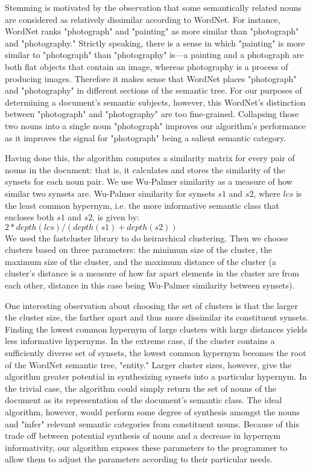 \documentclass[12pt]{article}
\begin{document}
    Stemming is motivated by the observation that some semantically related nouns are considered as relatively dissimilar according to WordNet. For instance, WordNet ranks "photograph" and "painting" as more similar than "photograph" and "photography." Strictly speaking, there is a sense in which "painting" is more similar to "photograph" than "photography" is—a painting and a photograph are both flat objects that contain an image, whereas photography is a process of producing images. Therefore it makes sense that WordNet places "photograph" and "photography" in different sections of the semantic tree. For our purposes of determining a document's semantic subjects, however, this WordNet's distinction between "photograph" and "photography" are too fine-grained. Collapsing those two nouns into a single noun "photograph" improves our algorithm's performance as it improves the signal for "photograph" being a salient semantic category.

    Having done this, the algorithm computes a similarity matrix for every pair of nouns in the document: that is, it calculates and stores the similarity of the synsets for each noun pair. We use Wu-Palmer similarity as a measure of how similar two synsets are. Wu-Palmer similarity for synsets $s1$ and $s2$, where $lcs$ is the least common hypernym, i.e. the more informative semantic class that encloses both $s1$ and $s2$, is given by:\\

    $2*depth(lcs) / (depth(s1) + depth(s2))$\\

    We used the fastcluster library to do heirarchical clustering. Then we choose clusters based on three parameters: the minimum size of the cluster, the maximum size of the cluster, and the maximum distance of the cluster (a cluster's distance is a measure of how far apart elements in the cluster are from each other, distance in this case being Wu-Palmer similarity between synsets).

    One interesting observation about choosing the set of clusters is that the larger the cluster size, the farther apart and thus more dissimilar its constituent synsets. Finding the lowest common hypernym of large clusters with large distances yields less informative hypernyms. In the extreme case, if the cluster contains a sufficiently diverse set of synsets, the lowest common hypernym becomes the root of the WordNet semantic tree, "entity." Larger cluster sizes, however, give the algorithm greater potential in synthesizing synsets into a particular hypernym. In the trivial case, the algorithm could simply return the set of nouns of the document as its representation of the document's semantic class. The ideal algorithm, however, would perform some degree of synthesis amongst the nouns and "infer" relevant semantic categories from constituent nouns. Because of this trade off between potential synthesis of nouns and a decrease in hypernym informativity, our algorithm exposes these parameters to the programmer to allow them to adjust the parameters according to their particular needs.
\end{document}
